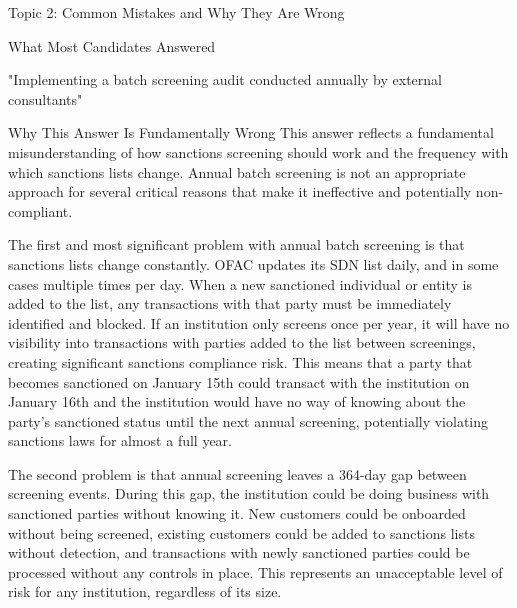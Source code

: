 \documentclass[8pt]{beamer}  %
\newcommand{\wrong}{\textcolor{errorred}{\ding{55}}}
\begin{document}
	\begin{frame}{Topic 2: Common Mistakes and Why They Are Wrong}
		\begin{block}{\large \wrong \textcolor{errorred}{What Most Candidates Answered}}
			\begin{center}
				\Large "Implementing a batch screening audit conducted annually by external consultants"
			\end{center}
		\end{block}
		
		\vspace{0.2cm}
		\begin{block}{\large Why This Answer Is Fundamentally Wrong}
			This answer reflects a fundamental misunderstanding of how sanctions screening should work and the frequency with which sanctions lists change. Annual batch screening is not an appropriate approach for several critical reasons that make it ineffective and potentially non-compliant.
			
			The first and most significant problem with annual batch screening is that sanctions lists change constantly. OFAC updates its SDN list daily, and in some cases multiple times per day. When a new sanctioned individual or entity is added to the list, any transactions with that party must be immediately identified and blocked. If an institution only screens once per year, it will have no visibility into transactions with parties added to the list between screenings, creating significant sanctions compliance risk. This means that a party that becomes sanctioned on January 15th could transact with the institution on January 16th and the institution would have no way of knowing about the party's sanctioned status until the next annual screening, potentially violating sanctions laws for almost a full year.
			
			The second problem is that annual screening leaves a 364-day gap between screening events. During this gap, the institution could be doing business with sanctioned parties without knowing it. New customers could be onboarded without being screened, existing customers could be added to sanctions lists without detection, and transactions with newly sanctioned parties could be processed without any controls in place. This represents an unacceptable level of risk for any institution, regardless of its size.
			

\end{block}
\end{frame}
\end{document}
